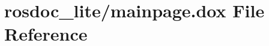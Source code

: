 \hypertarget{mainpage_8dox}{}\section{rosdoc\+\_\+lite/mainpage.dox File Reference}
\label{mainpage_8dox}
